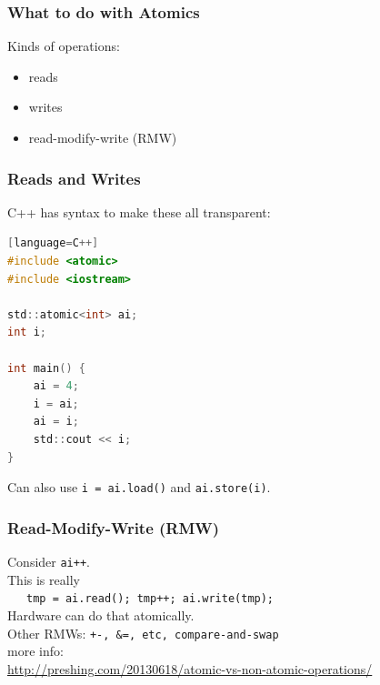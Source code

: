 \begin{frame}
  \frametitle{What to do with Atomics}

  
    \Large
    Kinds of operations:
    \begin{itemize}
    \item reads
    \item writes
    \item read-modify-write (RMW)
    \end{itemize}
  
\end{frame}

\begin{frame}[fragile]
  \frametitle{Reads and Writes}

  
    C++ has syntax to make these all transparent:
\begin{lstlisting}[language=C][language=C++]
#include <atomic>
#include <iostream>

std::atomic<int> ai;
int i;

int main() {
    ai = 4;
    i = ai;
    ai = i;
    std::cout << i;
}
\end{lstlisting}
Can also use {\tt i = ai.load()} and {\tt ai.store(i)}.
  
\end{frame}

\begin{frame}
  \frametitle{Read-Modify-Write (RMW)}

  
    Consider {\tt ai++}.\\[1em]
    This is really \\
    ~~~{\tt tmp = ai.read(); tmp++; ai.write(tmp); }\\[1em]
    Hardware can do that atomically.\\[1em]
    Other RMWs: {\tt +-, \&=, etc, compare-and-swap}\\[2em]

    {\small
      more info:\\ \url{http://preshing.com/20130618/atomic-vs-non-atomic-operations/}
      }
  
\end{frame}








